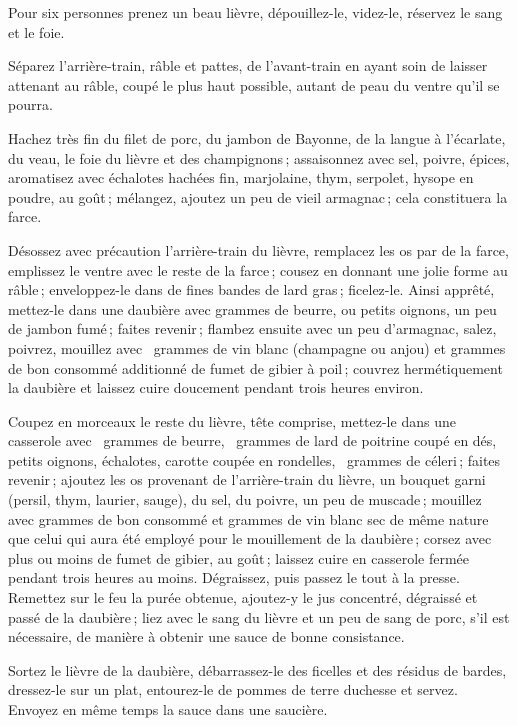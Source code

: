 Pour six personnes prenez un beau lièvre, dépouillez-le, videz-le, réservez le
sang et le foie.

Séparez l'arrière-train, râble et pattes, de l'avant-train en ayant soin de
laisser attenant au râble, coupé le plus haut possible, autant de peau du
ventre qu'il se pourra.

Hachez très fin du filet de porc, du jambon de Bayonne, de la langue
à l'écarlate, du veau, le foie du lièvre et des champignons ; assaisonnez avec
sel, poivre, épices, aromatisez avec échalotes hachées fin, marjolaine, thym,
serpolet, hysope en poudre, au goût ; mélangez, ajoutez un peu de vieil
armagnac ; cela constituera la farce.

Désossez avec précaution l'arrière-train du lièvre, remplacez les os par de la
farce, emplissez le ventre avec le reste de la farce ; cousez en donnant une
jolie forme au râble ; enveloppez-le dans de fines bandes de lard gras ;
ficelez-le. Ainsi apprêté, mettez-le dans une daubière avec {\mmm}
grammes de beurre, {\mmm} ou {\mmm} petits oignons, un peu de jambon
fumé ; faites revenir ; flambez ensuite avec un peu d'armagnac, salez, poivrez,
mouillez avec {\mmm} grammes de vin blanc (champagne ou anjou) et
{\mmm} grammes de bon consommé additionné de fumet de gibier à poil ;
couvrez hermétiquement la daubière et laissez cuire doucement pendant trois
heures environ.

Coupez en morceaux le reste du lièvre, tête comprise, mettez-le dans une
casserole avec {\mmm} grammes de beurre, {\mmm} grammes de lard de
poitrine coupé en dés, {\mmm} petits oignons, {\mmm} échalotes, {\mmm} carotte coupée en
rondelles, {\mmm} grammes de céleri ; faites revenir ; ajoutez les os
provenant de l'arrière-train du lièvre, un bouquet garni (persil, thym,
laurier, sauge), du sel, du poivre, un peu de muscade ; mouillez avec
{\mmm} grammes de bon consommé et {\mmm} grammes de vin blanc sec
de même nature que celui qui aura été employé pour le mouillement de la
daubière ; corsez avec plus ou moins de fumet de gibier, au goût ; laissez
cuire en casserole fermée pendant trois heures au moins. Dégraissez, puis
passez le tout à la presse. Remettez sur le feu la purée obtenue, ajoutez-y le
jus concentré, dégraissé et passé de la daubière ; liez avec le sang du lièvre
et un peu de sang de porc, s'il est nécessaire, de manière à obtenir une sauce
de bonne consistance.

Sortez le lièvre de la daubière, débarrassez-le des ficelles et des résidus de
bardes, dressez-le sur un plat, entourez-le de pommes de terre duchesse et servez.
Envoyez en même temps la sauce dans une saucière.

